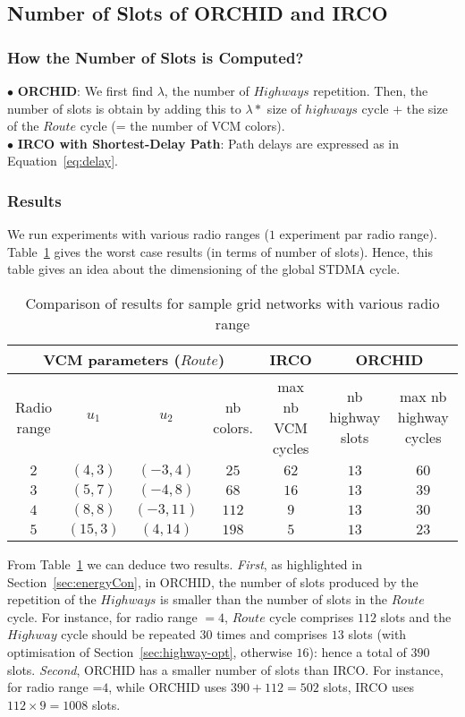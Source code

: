 \subsection{Number of Slots of ORCHID and IRCO}\label{sec:slotOrchSimul}
\subsubsection{How the Number of Slots is Computed?} 
\noindent $\bullet $ {\bf ORCHID}: 
We first find $\lambda$, the number of $Highways$ repetition. Then, the number of slots is obtain by adding this to $\lambda *$ size of $highways$ cycle  $+$ the size of the $Route$ cycle (= the number of VCM colors). \\
$\bullet $ {\bf IRCO with Shortest-Delay Path}: Path delays are expressed as in Equation~\ref{eq:delay}.


\subsubsection{Results}
We run experiments with various radio ranges ($1$ experiment par radio range). Table~\ref{tab:orchid-result} gives the worst case results (in terms of number of slots). Hence, this table gives an idea about the dimensioning of the global STDMA cycle. 

\begin{table}[!h]
\centering
\begin{scriptsize}
\begin{tabular}{|c|c|c|c|c|c|c|}\hline
\multicolumn{4}{|c|}{VCM parameters ($Route$)} & IRCO &
    \multicolumn{2}{c|}{ORCHID} \\ \hline
Radio range & $u_1$ & $u_2$ & nb colors. & max nb VCM cycles  & nb highway slots &  max nb highway cycles\\ \hline
$2$& $(4, 3)$ & $(-3, 4)$& $25$ & $62$ & $13$ & $60$\\ \hline
$3$& $(5, 7)$ & $(-4, 8)$& $68$ & $16$ & $13$ & $39$\\ \hline
$4$& $(8, 8)$ & $(-3, 11)$& $112$ & $9$ & $13$ & $30$\\ \hline
$5$& $(15, 3)$ & $(4, 14)$& $198$ & $5$ & $13$ & $23$\\ \hline
 \end{tabular} 
\end{scriptsize}
\caption{Comparison of results for sample grid networks with various
radio range\label{tab:orchid-result}}
\end{table}


From Table~\ref{tab:orchid-result} we can deduce two results. \textit{First}, as highlighted in Section~\ref{sec:energyCon}, in ORCHID, the number of slots produced by the repetition of the $Highways$ is smaller than the number of slots in the $Route$ cycle.
For instance, for radio range $=4$, $Route$ cycle comprises $112$ slots and the $Highway$ cycle should be repeated $30$ times and comprises $13$ slots (with optimisation of Section~\ref{sec:highway-opt}, otherwise $16$): hence a total of $390$ slots. 
\textit{Second}, ORCHID has a smaller number of 
slots than IRCO. For instance, for radio range =$4$, while ORCHID uses $390+112=502$ slots, IRCO uses $112 \times 9=1008$ slots.




